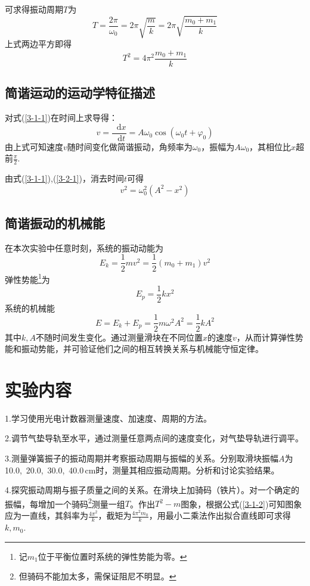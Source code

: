 \documentclass[UTF-8,twoside,cs4size]{ctexart}
\newcommand*{\dif}{\mathop{}\!\mathrm{d}}
\begin{document}
	可求得振动周期$ T $为
	\[T=\frac{2\pi}{\omega_0}=2\pi\sqrt{\frac mk}=2\pi\sqrt{\frac{m_0+m_1}{k}}\]
	上式两边平方即得
	\begin{equation}\label{3-1-2}
		T^2=4\pi^2\frac{m_0+m_1}{k}	
	\end{equation}
	
	\subsection{简谐运动的运动学特征描述}
	对式(\ref{3-1-1})在时间上求导得：
	\begin{equation}\label{3-2-1}
		v=\frac{\dif x}{\dif t}=A\omega_0\cos(\omega_0t+\varphi_0)
	\end{equation}
	由上式可知速度$ v $随时间变化做简谐振动，角频率为$ \omega_0 $，振幅为$ A\omega_0 $，其相位比$ x $超前$ \frac\pi2 $.
	
	由式(\ref{3-1-1}),(\ref{3-2-1})，消去时间$ t $可得
	\[v^2=\omega_0^2(A^2-x^2)\]
	
	\subsection{简谐振动的机械能}
	在本次实验中任意时刻，系统的振动动能为
	\[E_k=\frac12mv^2=\frac12(m_0+m_1)v^2\]
	弹性势能\footnote{记$ m_1 $位于平衡位置时系统的弹性势能为零。}为
	\[E_p=\frac12kx^2\]
	系统的机械能
	\begin{equation}\label{3-3-3}
		E=E_k+E_p=\frac12m\omega^2A^2=\frac12kA^2
	\end{equation}
	其中$ k,A $不随时间发生变化。通过测量滑块在不同位置$ x $的速度$ v $，从而计算弹性势能和振动势能，并可验证他们之间的相互转换关系与机械能守恒定律。
	
	\section{实验内容}
	1.学习使用光电计数器测量速度、加速度、周期的方法。
	
	2.调节气垫导轨至水平，通过测量任意两点间的速度变化，对气垫导轨进行调平。
	
	3.测量弹簧振子的振动周期并考察振动周期与振幅的关系。分别取滑块振幅$ A $为10.0,\ 20.0,\ 30.0,\ 40.0\,cm时，测量其相应振动周期。分析和讨论实验结果。
	
	4.探究振动周期与振子质量之间的关系。在滑块上加骑码（铁片）。对一个确定的振幅，每增加一个骑码\footnote{但骑码不能加太多，需保证阻尼不明显。}测量一组$ T $。作出$ T^2-m $图象，根据公式(\ref{3-1-2})可知图象应为一直线，其斜率为$ \frac{4\pi^2}{k} $，截矩为$ \frac{4\pi^2m_0}{k} $，用最小二乘法作出拟合直线即可求得$ k,m_0 $.
	
\end{document}
